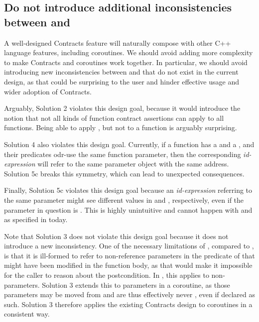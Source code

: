\subsection{Do not introduce additional inconsistencies between  and }

A well-designed Contracts feature will naturally compose with other C++ language features, including coroutines. We should avoid adding more complexity to make Contracts and coroutines work together. In particular, we should avoid introducing new inconsistencies between  and  that do not exist in the current design, as that could be surprising to the user and hinder effective usage and wider adoption of Contracts.

Arguably, Solution 2 violates this design goal, because it would introduce the notion that not all kinds of function contract assertions can apply to all functions. Being able to apply , but not  to a function is arguably surprising.

Solution 4 also violates this design goal. Currently, if a function has a  and a , and their predicates odr-use the same function parameter, then the corresponding \emph{id-expression} will refer to the same parameter object with the same address. Solution 5c breaks this symmetry, which can lead to unexpected consequences.

Finally, Solution 5c violates this design goal because an \emph{id-expression} referring to the same parameter might see different values in  and , respectively, even if the parameter in question is . This is highly unintuitive and cannot happen with  and  as specified in \cite{P2900R8} today.

Note that Solution 3 does not violate this design goal because it does not introduce a new inconsistency. One of the necessary limitations of , compared to , is that it is ill-formed to refer to non-reference parameters in the predicate of  that might have been modified in the function body, as that would make it impossible for the caller to reason about the postcondition. In \cite{P2900R8}, this applies to non- parameters. Solution 3 extends this to  parameters in a coroutine, as those parameters may be moved from and are thus effectively never , even if declared as such. Solution 3 therefore applies the existing Contracts design to coroutines in a consistent way.

